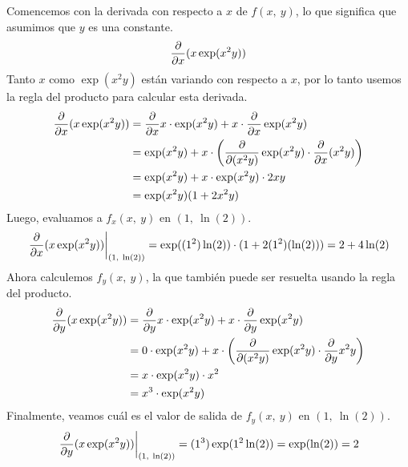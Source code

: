 \documentclass[12pt]{article}
\begin{document}
\solucion Comencemos con la derivada con respecto a $x$ de $f(x, \ y)$, lo que significa que asumimos que $y$ es una constante.
\[
  \frac{\partial }{\partial x} (x \exp(x^{2}y))
\]
Tanto $x$ como $\exp(x^{2}y)$ están variando con respecto a $x$, por lo tanto usemos la regla del producto para calcular esta derivada.
\begin{align*}
  \frac{\partial }{\partial x} (x \exp(x^{2}y)) &= \frac{\partial }{\partial x} x \cdot \exp(x^{2}y) + x \cdot \frac{\partial }{\partial x} \exp(x^{2}y) \\
                                &= \exp(x^{2}y) + x \cdot \left(\frac{\partial }{\partial (x^{2}y)} \exp(x^{2}y) \cdot \frac{\partial }{\partial x} (x^{2}y)\right) \\
                                &= \exp(x^{2}y) + x \cdot \exp(x^{2}y) \cdot 2xy \\
                                &= \exp(x^{2}y) (1 + 2x^{2}y)
\end{align*}
Luego, evaluamos a $f_{x}(x, \ y)$ en $(1, \ \ln(2))$.
\[
  \pderivpar{x}{(x \exp(x^{2}y))}{(1, \ \ln(2))} = \exp((1^{2}) \ln(2)) \cdot (1 + 2(1^{2})(\ln(2)))
                                                 = 2 + 4 \ln(2)
\]
Ahora calculemos $f_{y}(x, \ y)$, la que también puede ser resuelta usando la regla del producto.
\begin{align*}
  \frac{\partial }{\partial y} (x \exp(x^{2}y)) &= \frac{\partial }{\partial y} x \cdot \exp(x^{2}y) + x \cdot \frac{\partial }{\partial y} \exp(x^{2}y) \\
                                &= 0 \cdot \exp(x^{2}y) + x \cdot \left(\frac{\partial }{\partial (x^{2}y)} \exp(x^{2}y) \cdot \frac{\partial }{\partial y} x^{2}y\right) \\
                                &= x \cdot \exp(x^{2}y) \cdot x^{2} \\
                                &= x^{3} \cdot \exp(x^{2}y)
\end{align*}
Finalmente, veamos cuál es el valor de salida de $f_{y}(x, \ y)$ en $(1, \ \ln(2))$.
\[
  \pderivpar{y}{(x \exp(x^{2}y))}{(1, \ \ln(2))} = (1^{3}) \exp(1^{2} \ln(2)) = \exp(\ln(2)) = 2
\]
\end{document}
